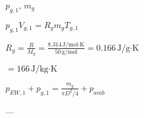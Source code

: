 \( p_{g,1} \), \( m_g \)  

\( p_{g,1} V_{g,1} = R_g m_g T_{g,1} \)  

\( R_g = \frac{R}{M_g} = \frac{8.314 \, \text{J/mol·K}}{50 \, \text{g/mol}} = 0.166 \, \text{J/g·K} \)  

\( = 166 \, \text{J/kg·K} \)  

\( p_{EW,1} + p_{g,1} = \frac{m_g}{\pi D^2 / 4} + p_{amb} \)  

---